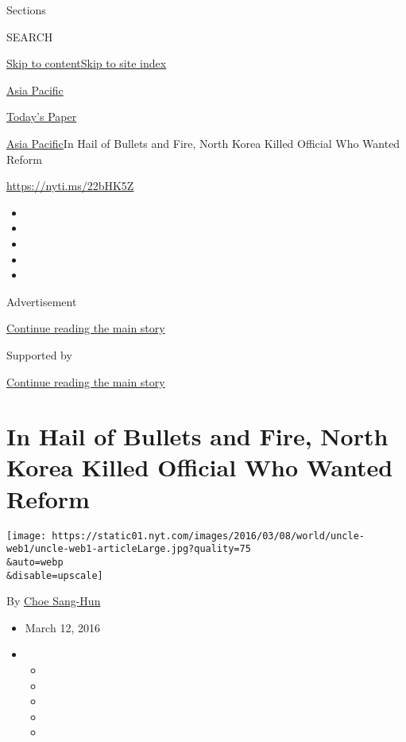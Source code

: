 Sections

SEARCH

\protect\hyperlink{site-content}{Skip to
content}\protect\hyperlink{site-index}{Skip to site index}

\href{https://www.nytimes.com/section/world/asia}{Asia Pacific}

\href{https://myaccount.nytimes.com/auth/login?response_type=cookie\&client_id=vi}{}

\href{https://www.nytimes.com/section/todayspaper}{Today's Paper}

\href{/section/world/asia}{Asia Pacific}\textbar{}In Hail of Bullets and
Fire, North Korea Killed Official Who Wanted Reform

\url{https://nyti.ms/22bHK5Z}

\begin{itemize}
\item
\item
\item
\item
\item
\end{itemize}

Advertisement

\protect\hyperlink{after-top}{Continue reading the main story}

Supported by

\protect\hyperlink{after-sponsor}{Continue reading the main story}

\hypertarget{in-hail-of-bullets-and-fire-north-korea-killed-official-who-wanted-reform}{%
\section{In Hail of Bullets and Fire, North Korea Killed Official Who
Wanted
Reform}\label{in-hail-of-bullets-and-fire-north-korea-killed-official-who-wanted-reform}}

\texttt{[image: https://static01.nyt.com/images/2016/03/08/world/uncle-web1/uncle-web1-articleLarge.jpg?quality=75\\\&auto=webp\\\&disable=upscale]}

By \href{http://www.nytimes.com/by/choe-sang-hun}{Choe Sang-Hun}

\begin{itemize}
\item
  March 12, 2016
\item
  \begin{itemize}
  \item
  \item
  \item
  \item
  \item
  \end{itemize}
\end{itemize}

